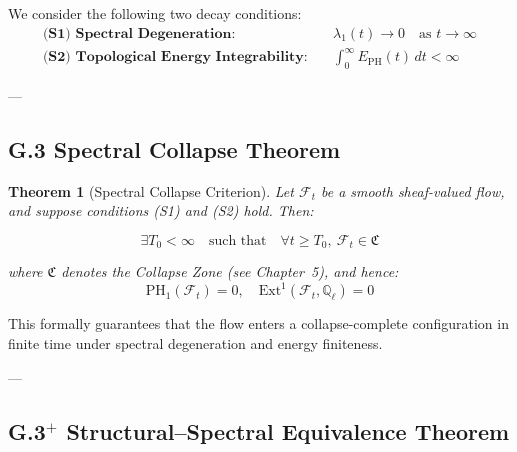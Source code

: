\documentclass[11pt]{article}
\newtheorem{theorem}{Theorem}[section]
\begin{document}
We consider the following two decay conditions:
\begin{align*}
\textbf{(S1) Spectral Degeneration:} & \quad \lambda_1(t) \to 0 \quad \text{as } t \to \infty \\
\textbf{(S2) Topological Energy Integrability:} & \quad \int_0^\infty E_{\mathrm{PH}}(t)\, dt < \infty
\end{align*}

---

\subsection*{G.3 Spectral Collapse Theorem}

\begin{theorem}[Spectral Collapse Criterion]
Let \( \mathcal{F}_t \) be a smooth sheaf-valued flow, and suppose conditions (S1) and (S2) hold. Then:

\[
\exists T_0 < \infty \quad \text{such that} \quad \forall t \geq T_0,\ \mathcal{F}_t \in \mathfrak{C}
\]

where \( \mathfrak{C} \) denotes the Collapse Zone (see Chapter~5), and hence:
\[
\mathrm{PH}_1(\mathcal{F}_t) = 0, \quad \mathrm{Ext}^1(\mathcal{F}_t, \mathbb{Q}_\ell) = 0
\]
\end{theorem}

\noindent
This formally guarantees that the flow enters a collapse-complete configuration in finite time under spectral degeneration and energy finiteness.

---

\subsection*{G.3$^+$ Structural--Spectral Equivalence Theorem}
\label{sec:spectral-structural-equiv}
\end{document}
